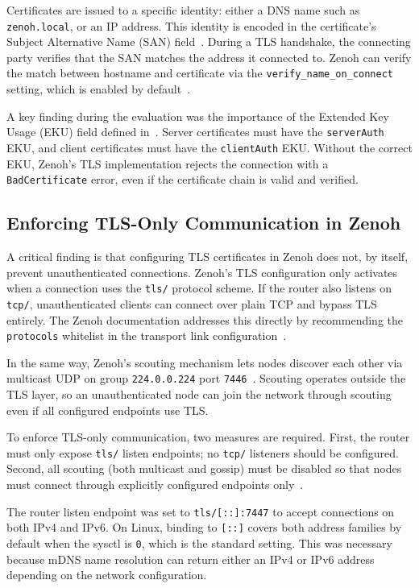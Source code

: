 \documentclass[11pt,a4paper]{article}
\begin{document}
Certificates are issued to a specific identity: either a DNS name
such as \texttt{zenoh.local}, or an IP address. This identity is
encoded in the certificate's Subject Alternative Name (SAN)
field~\citep{rfc5280}. During a TLS handshake, the connecting party
verifies that the SAN matches the address it connected to. Zenoh can
verify the match between hostname and certificate via the
\texttt{verify\_name\_on\_connect} setting, which is enabled by
default~\citep{zenoh-config}.

A key finding during the evaluation was the importance of the
Extended Key Usage (EKU) field defined in~\citep{rfc5280}. Server
certificates must have the \texttt{serverAuth} EKU, and client
certificates must have the \texttt{clientAuth} EKU. Without the
correct EKU, Zenoh's TLS implementation rejects the connection with a
\texttt{BadCertificate} error, even if the certificate chain is valid
and verified.

\subsection{Enforcing TLS-Only Communication in Zenoh}

A critical finding is that configuring TLS certificates in Zenoh does
not, by itself, prevent unauthenticated connections. Zenoh's TLS
configuration only activates when a connection uses the \texttt{tls/}
protocol scheme. If the router also listens on \texttt{tcp/},
unauthenticated clients can connect over plain TCP and bypass TLS
entirely. The Zenoh documentation addresses this directly by
recommending the \texttt{protocols} whitelist in the transport link
configuration~\citep{zenoh-tls}.

In the same way, Zenoh's scouting mechanism lets nodes discover each
other via multicast UDP on group \texttt{224.0.0.224} port
\texttt{7446}~\citep{zenoh-deployment}. Scouting operates outside the
TLS layer, so an unauthenticated node can join the network through
scouting even if all configured endpoints use TLS.

To enforce TLS-only communication, two measures are required. First,
the router must only expose \texttt{tls/} listen endpoints; no
\texttt{tcp/} listeners should be configured. Second, all scouting
(both multicast and gossip) must be disabled so that nodes must
connect through explicitly configured endpoints
only~\citep{zenoh-config,zenoh-deployment}.

The router listen endpoint was set to \texttt{tls/[::]:7447} to
accept connections on both IPv4 and IPv6. On Linux, binding to
\texttt{[::]} covers both address families by default when the
 sysctl is \texttt{0}, which is the
standard setting. This was necessary because mDNS name resolution can return
either an IPv4 or IPv6 address depending on the network configuration.
\end{document}
